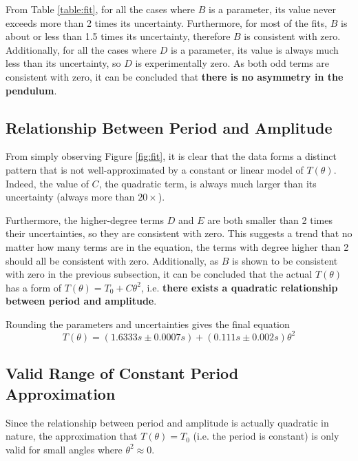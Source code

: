 \documentclass[aps,twocolumn,secnumarabic,nobalancelastpage,amsmath,amssymb,nofootinbib,floatfix]{revtex4}
\begin{document}
From Table \ref{table:fit}, for all the cases where $B$ is a parameter, its value never exceeds more than 2 times its
uncertainty. Furthermore, for most of the fits, $B$ is about or less than 1.5 times its uncertainty, therefore
\(B\) is consistent with zero. Additionally, for all the cases where $D$ is a parameter, its value is always much less
than its uncertainty, so \(D\) is experimentally zero. As both odd terms are consistent with zero, it can be
concluded that \textbf{there is no asymmetry in the pendulum}.

\subsection{Relationship Between Period and Amplitude}

From simply observing Figure \ref{fig:fit}, it is clear that the data forms a distinct pattern that is not
well-approximated by a constant or linear model of $T(\theta)$. Indeed, the value of $C$, the quadratic term, is always
much larger than its uncertainty (always more than $20 \times$).

Furthermore, the higher-degree terms $D$ and $E$ are both smaller than 2 times their uncertainties, so they are
consistent with zero. This suggests a trend that no matter how many terms are in the equation, the terms with degree
higher than 2 should all be consistent with zero. Additionally, as $B$ is shown to be consistent with zero in the
previous subsection, it can be concluded that the actual $T(\theta)$ has a form of $T(\theta) = T_0 + C\theta^2$, i.e.
\textbf{there exists a quadratic relationship between period and amplitude}.

Rounding the parameters and uncertainties gives the final equation
\begin{equation}
    T(\theta) = (1.6333\si{s} \pm 0.0007\si{s}) + (0.111\si{s} \pm 0.002\si{s})\theta^2
\end{equation}

\subsection{Valid Range of Constant Period Approximation}

Since the relationship between period and amplitude is actually quadratic in nature, the approximation that
$T(\theta) = T_0$ (i.e. the period is constant) is only valid for small angles where $\theta^2 \approx 0$.
\end{document}
